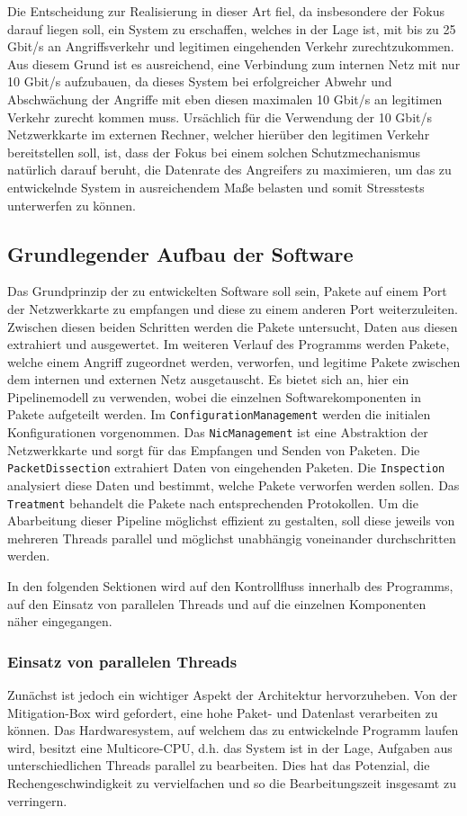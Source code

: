 \documentclass[../review_3.tex]{subfiles}
\begin{document}
Die Entscheidung zur Realisierung in dieser Art fiel, da insbesondere der Fokus darauf liegen soll, ein System zu erschaffen, welches in der Lage ist, mit bis zu 25 Gbit/s an Angriffsverkehr und legitimen eingehenden Verkehr zurechtzukommen. Aus diesem Grund ist es ausreichend, eine Verbindung zum internen Netz mit nur 10 Gbit/s aufzubauen, da dieses System bei erfolgreicher Abwehr und Abschwächung der Angriffe mit eben diesen maximalen 10 Gbit/s an legitimen Verkehr zurecht kommen muss. Ursächlich für die Verwendung der 10 Gbit/s Netzwerkkarte im externen Rechner, welcher hierüber den legitimen Verkehr bereitstellen soll, ist, dass der Fokus bei einem solchen Schutzmechanismus natürlich darauf beruht, die Datenrate des Angreifers zu maximieren, um das zu entwickelnde System in ausreichendem Maße belasten und somit Stresstests unterwerfen zu können.

\subsection{Grundlegender Aufbau der Software} \label{section:basic_structure}
Das Grundprinzip der zu entwickelten Software soll sein, Pakete auf einem Port der Netzwerkkarte zu empfangen und diese zu einem anderen Port weiterzuleiten. Zwischen diesen beiden Schritten werden die Pakete untersucht, Daten aus diesen extrahiert und ausgewertet. Im weiteren Verlauf des Programms werden Pakete, welche einem Angriff zugeordnet werden, verworfen, und legitime Pakete zwischen dem internen und externen Netz ausgetauscht. Es bietet sich an, hier ein Pipelinemodell zu verwenden, wobei die einzelnen Softwarekomponenten in Pakete aufgeteilt werden. Im \texttt{ConfigurationManagement} werden die initialen Konfigurationen vorgenommen. Das \texttt{NicManagement} ist eine Abstraktion der Netzwerkkarte und sorgt für das Empfangen und Senden von Paketen. Die \texttt{PacketDissection} extrahiert Daten von eingehenden Paketen. Die \texttt{Inspection} analysiert diese Daten und bestimmt, welche Pakete verworfen werden sollen. Das \texttt{Treatment} behandelt die Pakete nach entsprechenden Protokollen. Um die Abarbeitung dieser Pipeline möglichst effizient zu gestalten, soll diese jeweils von mehreren Threads parallel und möglichst unabhängig voneinander durchschritten werden.

In den folgenden Sektionen wird auf den Kontrollfluss innerhalb des Programms, auf den Einsatz von parallelen Threads und auf die einzelnen Komponenten näher eingegangen.

\subsubsection{Einsatz von parallelen Threads}
Zunächst ist jedoch ein wichtiger Aspekt der Architektur hervorzuheben. Von der Mitigation-Box wird gefordert, eine hohe Paket- und Datenlast verarbeiten zu können. Das Hardwaresystem, auf welchem das zu entwickelnde Programm laufen wird, besitzt eine Multicore-CPU, d.h. das System ist in der Lage, Aufgaben aus unterschiedlichen Threads parallel zu bearbeiten. Dies hat das Potenzial, die Rechengeschwindigkeit zu vervielfachen und so die Bearbeitungszeit insgesamt zu verringern.
\end{document}
